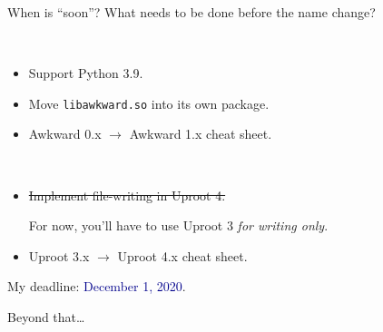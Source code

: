 \documentclass[aspectratio=169]{beamer}
\begin{document}
\begin{frame}{When is ``soon''? What needs to be done before the name change?}
\large
\vspace{0.5 cm}

\begin{description}\setlength{\itemsep}{0.5 cm}
\item[\Large Awkward Array:] \mbox{ } \\

\vspace{0.3 cm}
\begin{itemize}\setlength{\itemsep}{0.2 cm}
\item Support Python 3.9.

\item Move \texttt{libawkward.so} into its own package.

\item Awkward 0.x $\to$ Awkward 1.x cheat sheet.
\end{itemize}

\item[\Large Uproot:] \mbox{ } \\

\vspace{0.2 cm}
\begin{itemize}\setlength{\itemsep}{0.2 cm}
\item \sout{Implement file-writing in Uproot 4.}

For now, you'll have to use Uproot 3 {\it for writing only}.

\item Uproot 3.x $\to$ Uproot 4.x cheat sheet.
\end{itemize}
\end{description}

\vspace{0.65 cm}
{\Large My deadline: \textcolor{darkblue}{December 1, 2020}.}
\end{frame}

\begin{frame}{Beyond that\ldots}



\end{frame}
\end{document}
